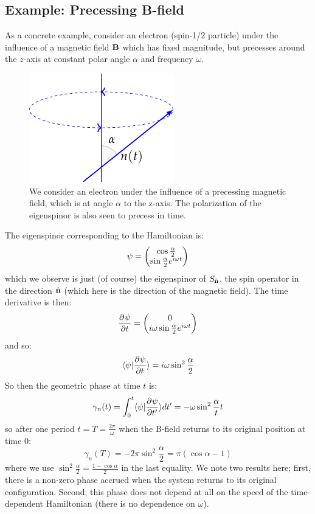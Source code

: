 \subsection{Example: Precessing B-field}
As a concrete example, consider an electron (spin-1/2 particle) under the influence of a magnetic field $\mathbf{B}$ which has fixed magnitude, but precesses around the $z$-axis at constant polar angle $\alpha$ and frequency $\omega$. 

\begin{figure}[htbp]
    \centering
    \includegraphics[]{Images/fig-spinprecessberry.pdf}
    \caption{We consider an electron under the influence of a precessing magnetic field, which is at angle $\alpha$ to the z-axis. The polarization of the eigenspinor is also seen to precess in time.}
    \label{fig-spinprecessberry}
\end{figure}
The eigenspinor corresponding to the Hamiltonian is:
\begin{equation}
    \psi = \begin{pmatrix}\cos\frac{\alpha}{2} \\ \sin\frac{\alpha}{2}e^{i\omega t}\end{pmatrix}
\end{equation}
which we observe is just (of course) the eigenspinor of $S_{\hat{\mathbf{n}}}$, the spin operator in the direction $\hat{\mathbf{n}}$ (which here is the direction of the magnetic field). The time derivative is then:
\begin{equation}
    \dpd{\psi}{t} = \m{0\\ i \omega \sin \frac{\alpha}{2}e^{i\omega t}}
\end{equation}
and so:
\begin{equation}
    \braket{\psi}{\dpd{\psi}{t}} = i\omega \sin^2\frac{\alpha}{2}
\end{equation}
So then the geometric phase at time $t$ is:
\begin{equation}
    \gamma_n(t) = \int_0^t \braket{\psi}{\dpd{\psi}{t'}}dt' = -\omega \sin^2\frac{\alpha}{t}t
\end{equation}
so after one period $t = T = \frac{2\pi}{\omega}$ when the B-field returns to its original position at time $0$:
\begin{equation}
    \gamma_n(T) = -2\pi\sin^2\frac{\alpha}{2} = \pi(\cos\alpha - 1)
\end{equation}
where we use $\sin^2\frac{\alpha}{2} = \frac{1 -\cos\alpha}{2}$ in the last equality. We note two results here; first, there is a non-zero phase accrued when the system returns to its original configuration. Second, this phase does not depend at all on the speed of the time-dependent Hamiltonian (there is no dependence on $\omega$).

